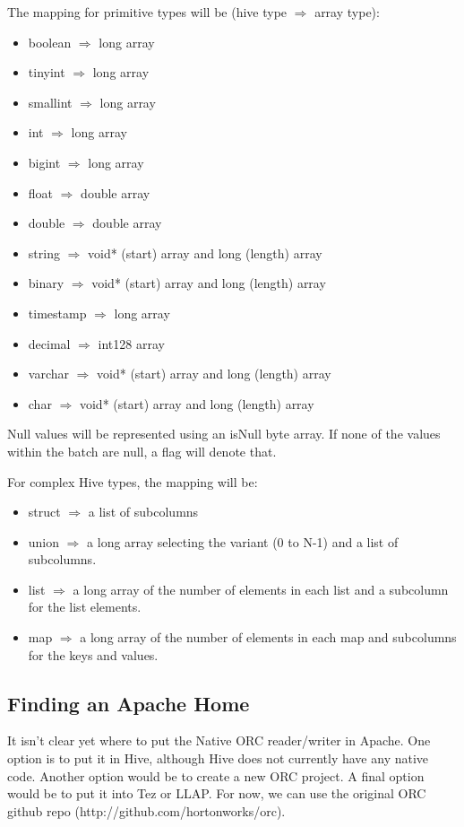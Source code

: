 \documentclass{article}
\begin{document}
The mapping for primitive types will be (hive type $\Rightarrow$ array type):
\begin{itemize}
\item boolean $\Rightarrow$ long array
\item tinyint $\Rightarrow$ long array
\item smallint $\Rightarrow$ long array
\item int $\Rightarrow$ long array
\item bigint $\Rightarrow$ long array
\item float $\Rightarrow$ double array
\item double $\Rightarrow$ double array
\item string $\Rightarrow$ void* (start) array and long (length) array
\item binary $\Rightarrow$ void* (start) array and long (length) array
\item timestamp $\Rightarrow$ long array
\item decimal $\Rightarrow$ int128 array
\item varchar $\Rightarrow$ void* (start) array and long (length) array
\item char $\Rightarrow$ void* (start) array and long (length) array
\end{itemize}

Null values will be represented using an isNull byte array. If none of
the values within the batch are null, a flag will denote that.

For complex Hive types, the mapping will be:
\begin{itemize}
\item struct $\Rightarrow$ a list of subcolumns
\item union $\Rightarrow$ a long array selecting the variant (0 to N-1) and a
  list of subcolumns.
\item list $\Rightarrow$ a long array of the number of elements in each list
  and a subcolumn for the list elements.
\item map $\Rightarrow$ a long array of the number of elements in each map
  and subcolumns for the keys and values.
\end{itemize}

\subsection{Finding an Apache Home}

It isn't clear yet where to put the Native ORC reader/writer in
Apache.  One option is to put it in Hive, although Hive does not
currently have any native code. Another option would be to create a
new ORC project. A final option would be to put it into Tez or
LLAP. For now, we can use the original ORC github repo
(http://github.com/hortonworks/orc).
\end{document}
